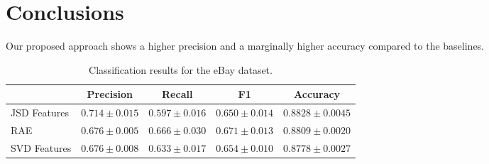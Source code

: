 \documentclass{article}
\begin{document}
\section{Conclusions}
\label{sec:conclusions}
Our proposed approach shows a higher precision
and a marginally higher accuracy compared to the baselines.



\begin{table*}[t]
\label{tab:classification-results}
\vspace{-4mm}
\begin{center}
\begin{tabular}{|l|c|c|c|c|}
\hline
&Precision & Recall & F1 & Accuracy
\\ \hline 
JSD Features         &$\mathbf{0.714}\pm 0.015$&$0.597\pm 0.016$&$0.650\pm
0.014$& $\mathbf{0.8828}\pm 0.0045$\\
RAE             &$0.676\pm 0.005$&$\mathbf{0.666}\pm 0.030$&$\mathbf{0.671}\pm
0.013$&$0.8809\pm 0.0020$ \\
SVD Features             &$0.676\pm 0.008$&$0.633\pm 0.017$&$0.654\pm
0.010$&$0.8778\pm 0.0027$\\
\hline
\end{tabular}
\caption{Classification results for the eBay dataset.}
\end{center}
\end{table*}








\end{document}
